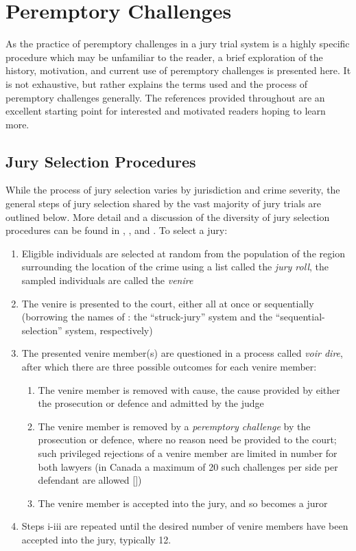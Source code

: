 \section{Peremptory Challenges} \label{c:background}

As the practice of peremptory challenges in a jury trial system is a highly specific procedure which may be unfamiliar to the
reader, a brief exploration of the history, motivation, and current use of peremptory challenges is presented here. It is not
exhaustive, but rather explains the terms used and the process of peremptory challenges generally. The references provided
throughout are an excellent starting point for interested and motivated readers hoping to learn more.

\subsection{Jury Selection Procedures} \label{sec:jurysel}

While the process of jury selection varies by jurisdiction and crime severity, the general steps of jury selection shared by the
vast majority of jury trials are outlined below. More detail and a discussion of the diversity of jury selection procedures can be
found in \cite{ford2010}, \cite{hansvidjudging}, and \cite{vandykejurysel}. To select a jury:

\begin{enumerate}
  \item Eligible individuals are selected at random from the population of the region surrounding the location of the crime using
    a list called the \textit{jury roll}, the sampled individuals are called the \textit{venire}
  \item The venire is presented to the court, either all at once or sequentially (borrowing the names of \cite{ford2010}: the
    ``struck-jury'' system and the ``sequential-selection'' system, respectively)
  \item The presented venire member(s) are questioned in a process called \textit{voir dire}, after which there are three possible
    outcomes for each venire member:
    \begin{enumerate}
      \item The venire member is removed with cause, the cause provided by either the prosecution or defence and admitted by
        the judge
      \item The venire member is removed by a \textit{peremptory challenge} by the prosecution or defence, where no reason
        need be provided to the court; such privileged rejections of a venire member are limited in number for both lawyers (in
        Canada a maximum of 20 such challenges per side per defendant are allowed [\cite{perempchallaw}])
      \item The venire member is accepted into the jury, and so becomes a juror
    \end{enumerate}
  \item Steps i-iii are repeated until the desired number of venire members have been accepted into the jury, typically 12.
\end{enumerate}

